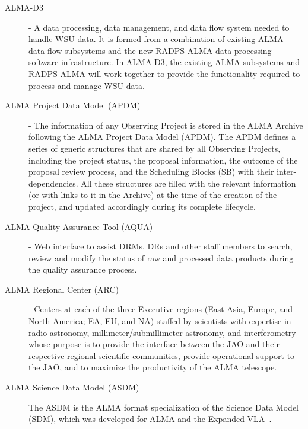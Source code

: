 \begin{description}
\item[ALMA-D3] - A data processing, data management, and data flow system needed to handle WSU data. It is formed from a combination of existing ALMA data-flow subsystems and the new \acf{RADPS-ALMA} data processing software infrastructure. In ALMA-D3, the existing ALMA subsystems and RADPS-ALMA will work together to provide the functionality required to process and manage WSU data.
\item[ALMA Project Data Model (APDM)] - The information of any Observing Project is stored in the ALMA Archive following the ALMA Project Data Model (APDM). The APDM defines a series of generic structures that are shared by all Observing Projects, including the project status, the proposal information, the outcome of the proposal review process, and the Scheduling Blocks (SB) with their inter-dependencies.
All these structures are filled with the relevant information (or with links to it in the Archive) at the time of the creation of the project, and updated accordingly during its complete lifecycle.
\item[ALMA Quality Assurance Tool (AQUA)] - Web interface to assist DRMs, DRs and other staff members to search, review and modify the status of raw and processed data products during the quality assurance process.
\item[ALMA Regional Center (ARC)] - Centers at each of the three Executive regions (East Asia, Europe, and North America; EA, EU, and NA) staffed by scientists with expertise in radio astronomy, millimeter/submillimeter astronomy, and interferometry whose purpose is to provide the interface between the JAO and their respective regional scientific communities, provide operational support to the JAO, and to maximize the productivity of the ALMA telescope. 
\item[ALMA Science Data Model (ASDM)] The ASDM is the ALMA format specialization of the Science Data Model (SDM), which was developed for ALMA and the Expanded VLA~\cite{Viallefond2006,Pokorny2009,Lucas2010}.


\end{description}
